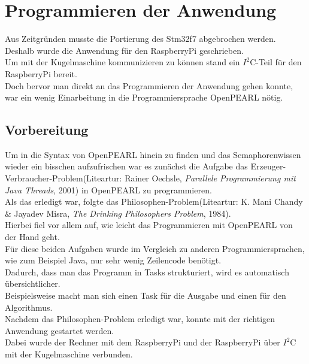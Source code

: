 \chapter{Programmieren der Anwendung}
Aus Zeitgründen musste die Portierung des Stm32f7 abgebrochen werden.\\
Deshalb wurde die Anwendung für den RaspberryPi geschrieben.\\
Um mit der Kugelmaschine kommunizieren zu können stand ein $I^2$C-Teil für den RaspberryPi bereit.\\
Doch bervor man direkt an das Programmieren der Anwendung gehen konnte, war ein wenig Einarbeitung in die Programmiersprache OpenPEARL nötig.\\
\section{Vorbereitung}
Um in die Syntax von OpenPEARL hinein zu finden und das Semaphorenwissen wieder ein bisschen aufzufrischen war es zunächst die Aufgabe das Erzeuger-Verbraucher-Problem(Liteartur:  Rainer Oechsle, {\textit{Parallele Programmierung mit Java Threads}}, 2001) in OpenPEARL zu programmieren.\\
Als das erledigt war, folgte das Philosophen-Problem(Liteartur: K. Mani Chandy \& Jayadev Misra, {\textit{The Drinking Philosophers Problem}}, 1984).\\
Hierbei fiel vor allem auf, wie leicht das Programmieren mit OpenPEARL von der Hand geht.\\
Für diese beiden Aufgaben wurde im Vergleich zu anderen Programmiersprachen, wie zum Beispiel Java, nur sehr wenig Zeilencode benötigt.\\
Dadurch, dass man das Programm in Tasks strukturiert, wird es automatisch übersichtlicher.\\
Beispielsweise macht man sich einen Task für die Ausgabe und einen für den Algorithmus.\\
Nachdem das Philosophen-Problem erledigt war, konnte mit der richtigen Anwendung gestartet werden.\\
Dabei wurde der Rechner mit dem RaspberryPi und der RaspberryPi über $I^2$C mit der Kugelmaschine verbunden.\\
\newpage
